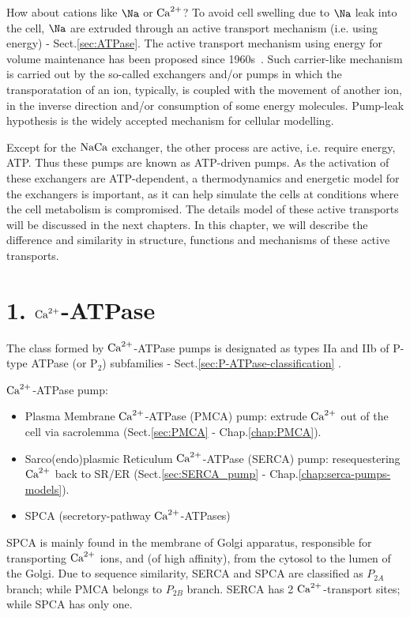 How about cations like $\Na$ or ${\text{Ca}^{2+}}$? To avoid cell swelling due to $\Na$ leak
into the cell, $\Na$ are extruded through an active transport mechanism (i.e.
using energy) - Sect.\ref{sec:ATPase}. The active transport mechanism using
energy for volume maintenance has been proposed since
1960s~\citep{Leaf1959,Tosteson1960}.  Such carrier-like mechanism is carried out
by the so-called exchangers and/or pumps in which the transporatation of an ion,
typically, is coupled with the movement of another ion, in the inverse direction
and/or consumption of some energy molecules. Pump-leak hypothesis is the widely
accepted mechanism for cellular modelling.

Except for the ${\text{NaCa}}$ exchanger, the other process are active,
i.e. require energy, ATP. Thus these pumps are known as ATP-driven
pumps.  As the activation of these exchangers are ATP-dependent, a
thermodynamics and energetic model for the exchangers is important, as
it can help simulate the cells at conditions where the cell metabolism
is compromised. The details model of these active transports will be discussed
in the next chapters. In this chapter, we will describe the difference and
similarity in structure, functions and mechanisms of these active transports.


\section{1. ${\text{Ca}^{2+}}$-ATPase}
\label{sec:Ca-ATPase}

The class formed by ${\text{Ca}^{2+}}$-ATPase pumps is designated as types IIa and IIb of
P-type ATPase (or P$_2$) subfamilies - Sect.\ref{sec:P-ATPase-classification}
\citep{Vangheluwe2009, Brini2009}.

${\text{Ca}^{2+}}$-ATPase pump:

\begin{itemize}
  \item Plasma Membrane ${\text{Ca}^{2+}}$-ATPase (PMCA) pump: extrude  ${\text{Ca}^{2+}}$
    out of the cell via sacrolemma (Sect.\ref{sec:PMCA} - Chap.\ref{chap:PMCA}). 

  \item Sarco(endo)plasmic Reticulum ${\text{Ca}^{2+}}$-ATPase (SERCA) pump: resequestering
${\text{Ca}^{2+}}$ back to SR/ER 
(Sect.\ref{sec:SERCA_pump} - Chap.\ref{chap:serca-pumps-models}).

  \item SPCA (secretory-pathway ${\text{Ca}^{2+}}$-ATPases)
\end{itemize}

SPCA is mainly found in the membrane of Golgi apparatus, responsible for
transporting ${\text{Ca}^{2+}}$ ions, and  (of high affinity), from the cytosol to
the lumen of the Golgi.  Due to sequence similarity, SERCA and SPCA are
classified as $P_{2A}$ branch; while PMCA belongs to $P_{2B}$ branch. SERCA  has
2 ${\text{Ca}^{2+}}$-transport sites; while SPCA has only one.

